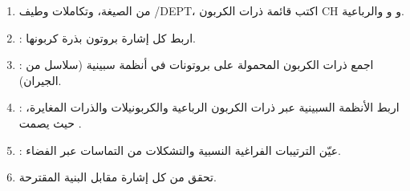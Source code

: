 \begin{method}\label{met:b3:advanced-nmr:solve-2d}
\begin{enumerate}
  \item من الصيغة، وتكاملات  وطيف /DEPT، اكتب قائمة
        ذرات الكربون CH و و والرباعية.
  \item {}: اربط كل إشارة بروتون بذرة كربونها.
  \item {}: اجمع ذرات الكربون المحمولة على بروتونات في أنظمة سبينية (سلاسل من
        الجيران).
  \item {}: اربط الأنظمة السبينية عبر ذرات الكربون الرباعية والكربونيلات 
        والذرات المغايرة، حيث يصمت .
  \item {}: عيّن الترتيبات الفراغية النسبية والتشكلات من
        التماسات عبر الفضاء.
  \item تحقق من كل إشارة مقابل البنية المقترحة.
\end{enumerate}
\end{method}


